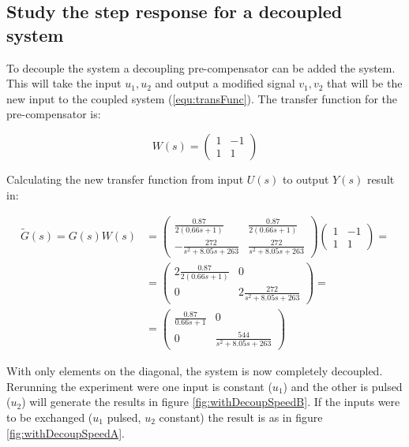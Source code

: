\documentclass[a4paper, titlepage]{article}
\begin{document}
\subsection{Study the step response for a decoupled system}
To decouple the system a decoupling pre-compensator can be added the system.
This will take the input $u_1, u_2$ and output a modified signal $v_1, v_2$ that will be the new input to the coupled system (\ref{equ:transFunc}).
The transfer function for the pre-compensator is:

\begin{equation}
W(s) = 
\begin{pmatrix}
1 & -1 \\ 1 & 1
\end{pmatrix}
\end{equation}

Calculating the new transfer function from input $U(s)$ to output $Y(s)$ result in:

\begin{equation}
\begin{split}
\tilde{G}(s) = G(s)W(s) &= 
\begin{pmatrix}
\frac{0.87}{2(0.66s + 1)} & \frac{0.87}{2(0.66s + 1)} \\[6pt]
-\frac{272}{s^2 + 8.05s + 263} & \frac{272}{s^2 + 8.05s + 263}
\end{pmatrix}
\begin{pmatrix}
1 & -1 \\ 1 & 1
\end{pmatrix} = \\
&= \begin{pmatrix}
2\frac{0.87}{2(0.66s + 1)} & 0 \\[6pt]
0 & 2\frac{272}{s^2 + 8.05s + 263}
\end{pmatrix} = \\
&= \begin{pmatrix}
\frac{0.87}{0.66s + 1} & 0 \\[6pt]
0 & \frac{544}{s^2 + 8.05s + 263}
\end{pmatrix}
\end{split}
\label{equ:decoupled}
\end{equation}

With only elements on the diagonal, the system is now completely decoupled.
Rerunning the experiment were one input is constant ($u_1$) and the other is pulsed ($u_2$) will generate the results in figure \ref{fig:withDecoupSpeedB}.
If the inputs were to be exchanged ($u_1$ pulsed, $u_2$ constant) the result is as in figure \ref{fig:withDecoupSpeedA}.
\end{document}
